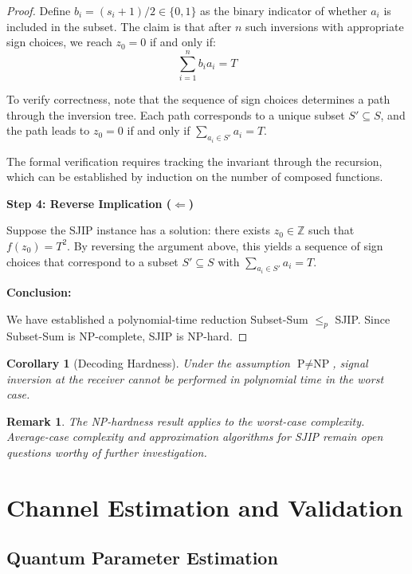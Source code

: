 \documentclass[12pt,a4paper]{article}
\newtheorem{corollary}[theorem]{Corollary}
\newtheorem{remark}[theorem]{Remark}
\newcommand{\Z}{\mathbb{Z}}
\begin{document}
\begin{proof}
Define $b_i = (s_i + 1)/2 \in \{0,1\}$ as the binary indicator of whether $a_i$ is included in the subset. The claim is that after $n$ such inversions with appropriate sign choices, we reach $z_0 = 0$ if and only if:
\begin{equation}
\sum_{i=1}^n b_i a_i = T
\end{equation}

To verify correctness, note that the sequence of sign choices determines a path through the inversion tree. Each path corresponds to a unique subset $S' \subseteq S$, and the path leads to $z_0 = 0$ if and only if $\sum_{a_i \in S'} a_i = T$.

The formal verification requires tracking the invariant through the recursion, which can be established by induction on the number of composed functions.

\textbf{Step 4: Reverse Implication ($\Leftarrow$)}

Suppose the SJIP instance has a solution: there exists $z_0 \in \Z$ such that $f(z_0) = T^2$. By reversing the argument above, this yields a sequence of sign choices that correspond to a subset $S' \subseteq S$ with $\sum_{a_i \in S'} a_i = T$.

\textbf{Conclusion:}

We have established a polynomial-time reduction Subset-Sum $\leq_p$ SJIP. Since Subset-Sum is NP-complete, SJIP is NP-hard.
\end{proof}

\begin{corollary}[Decoding Hardness]
Under the assumption $\text{P} \neq \text{NP}$, signal inversion at the receiver cannot be performed in polynomial time in the worst case.
\end{corollary}

\begin{remark}
The NP-hardness result applies to the worst-case complexity. Average-case complexity and approximation algorithms for SJIP remain open questions worthy of further investigation.
\end{remark}

\section{Channel Estimation and Validation}

\subsection{Quantum Parameter Estimation}
\end{document}
